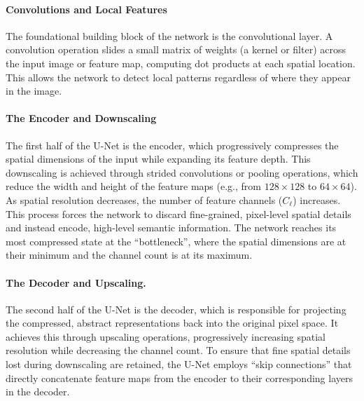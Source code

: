 \paragraph{Convolutions and Local Features}
The foundational building block of the network is the convolutional layer. A convolution operation slides a small matrix of weights (a kernel or filter) across the input image or feature map, computing dot products at each spatial location. This allows the network to detect local patterns regardless of where they appear in the image. 

\paragraph{The Encoder and Downscaling}
The first half of the U-Net is the encoder, which progressively compresses the spatial dimensions of the input while expanding its feature depth. This downscaling is achieved through strided convolutions or pooling operations, which reduce the width and height of the feature maps (e.g., from $128 \times 128$ to $64\times 64$). As spatial resolution decreases, the number of feature channels ($C_\ell$) increases. This process forces the network to discard fine-grained, pixel-level spatial details and instead encode, high-level semantic information. The network reaches its most compressed state at the ``bottleneck'', where the spatial dimensions are at their minimum and the channel count is at its maximum.


\paragraph{The Decoder and Upscaling.}
The second half of the U-Net is the decoder, which is responsible for projecting the compressed, abstract representations back into the original pixel space. It achieves this through upscaling operations, progressively increasing spatial resolution while decreasing the channel count. To ensure that fine spatial details lost during downscaling are retained, the U-Net employs ``skip connections'' that directly concatenate feature maps from the encoder to their corresponding layers in the decoder.

